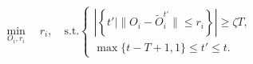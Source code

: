 \documentclass[lettersize,journal]{IEEEtran}
\begin{document}
\begin{equation}
\min_{O_i, r_i} \quad r_i, \quad
\text{s.t.} 
\begin{cases}
    \left| \left\{ t' \mid \| O_i - \tilde{O}_{i}^{t'} \| \leq r_i \right\} \right| \geq \zeta T, \\
    \max\{t-T+1, 1\} \leq t' \leq t.
\end{cases}
\label{eq:optimization}
\end{equation}





\end{document}
